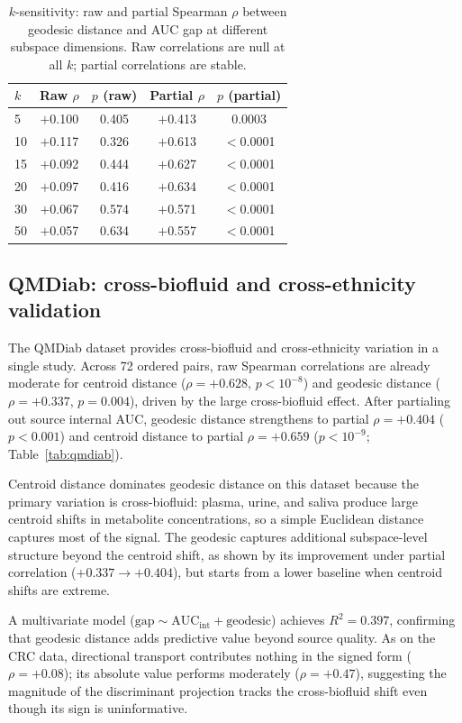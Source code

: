 \documentclass[11pt]{article}
\begin{document}
\begin{table}[t]
\centering
\caption{$k$-sensitivity: raw and partial Spearman $\rho$ between geodesic distance and AUC gap at different subspace dimensions. Raw correlations are null at all $k$; partial correlations are stable.}
\label{tab:ksens}
\begin{tabular}{lcccc}
\toprule
$k$ & Raw $\rho$ & $p$ (raw) & Partial $\rho$ & $p$ (partial) \\
\midrule
5  & $+$0.100 & 0.405 & $+$0.413 & 0.0003 \\
10 & $+$0.117 & 0.326 & $+$0.613 & $<$0.0001 \\
15 & $+$0.092 & 0.444 & $+$0.627 & $<$0.0001 \\
20 & $+$0.097 & 0.416 & $+$0.634 & $<$0.0001 \\
30 & $+$0.067 & 0.574 & $+$0.571 & $<$0.0001 \\
50 & $+$0.057 & 0.634 & $+$0.557 & $<$0.0001 \\
\bottomrule
\end{tabular}
\end{table}


\subsection{QMDiab: cross-biofluid and cross-ethnicity validation}
\label{sec:qmdiab}

The QMDiab dataset provides cross-biofluid and cross-ethnicity variation in a single study. Across 72 ordered pairs, raw Spearman correlations are already moderate for centroid distance ($\rho = +0.628$, $p < 10^{-8}$) and geodesic distance ($\rho = +0.337$, $p = 0.004$), driven by the large cross-biofluid effect. After partialing out source internal AUC, geodesic distance strengthens to partial $\rho = +0.404$ ($p < 0.001$) and centroid distance to partial $\rho = +0.659$ ($p < 10^{-9}$; Table~\ref{tab:qmdiab}).

Centroid distance dominates geodesic distance on this dataset because the primary variation is cross-biofluid: plasma, urine, and saliva produce large centroid shifts in metabolite concentrations, so a simple Euclidean distance captures most of the signal. The geodesic captures additional subspace-level structure beyond the centroid shift, as shown by its improvement under partial correlation ($+0.337 \to +0.404$), but starts from a lower baseline when centroid shifts are extreme.

A multivariate model ($\text{gap} \sim \text{AUC}_{\mathrm{int}} + \text{geodesic}$) achieves $R^2 = 0.397$, confirming that geodesic distance adds predictive value beyond source quality. As on the CRC data, directional transport contributes nothing in the signed form ($\rho = +0.08$); its absolute value performs moderately ($\rho = +0.47$), suggesting the magnitude of the discriminant projection tracks the cross-biofluid shift even though its sign is uninformative.
\end{document}
